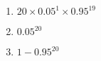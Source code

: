 \begin{enumerate}
    \item $20 \times 0.05^1 \times 0.95^{19}$
    \item $0.05^{20}$
    \item $1 - 0.95^{20}$
\end{enumerate}